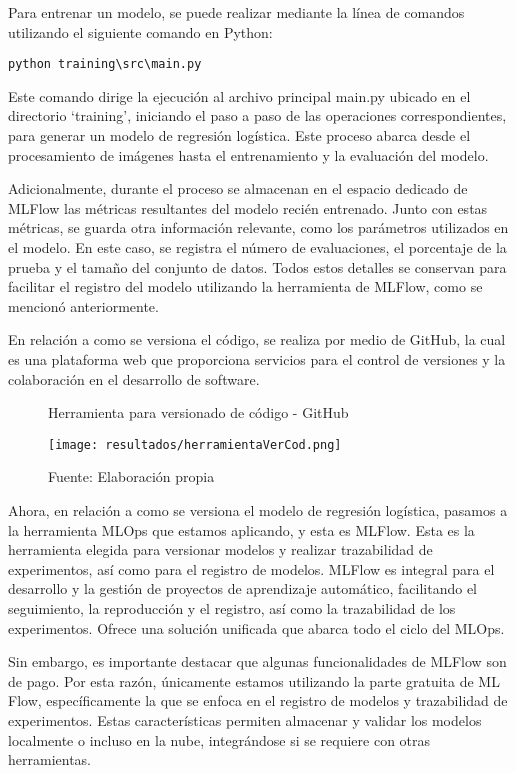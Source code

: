 Para entrenar un modelo, se puede realizar mediante la línea de comandos utilizando el siguiente comando en Python: 
\begin{verbatim}
python training\src\main.py
\end{verbatim}

Este comando dirige la ejecución al archivo principal main.py ubicado en el directorio `training', iniciando el paso a paso de las operaciones correspondientes, para generar un modelo de regresión logística. Este proceso abarca desde el procesamiento de imágenes hasta el entrenamiento y la evaluación del modelo. \newline

Adicionalmente, durante el proceso se almacenan en el espacio dedicado de MLFlow las métricas resultantes del modelo recién entrenado. Junto con estas métricas, se guarda otra información relevante, como los parámetros utilizados en el modelo. En este caso, se registra el número de evaluaciones, el porcentaje de la prueba y el tamaño del conjunto de datos. Todos estos detalles se conservan para facilitar el registro del modelo utilizando la herramienta de MLFlow, como se mencionó anteriormente. \newline

En relación a como se versiona el código, se realiza por medio de GitHub, la cual es una plataforma web que proporciona servicios para el control de versiones y la colaboración en el desarrollo de software.

\newpage

\begin{figure}[h]
\centering
\caption{Herramienta para versionado de código - GitHub}
\texttt{[image: resultados/herramientaVerCod.png]}
\caption*{\footnotesize Fuente: Elaboración propia}
\label{fig:figuraHerramientaVerCod}
\end{figure}

Ahora, en relación a como se versiona el modelo de regresión logística, pasamos a la herramienta MLOps que estamos aplicando, y esta es MLFlow. Esta es la herramienta elegida para versionar modelos y realizar trazabilidad de experimentos, así como para el registro de modelos. MLFlow es integral para el desarrollo y la gestión de proyectos de aprendizaje automático, facilitando el seguimiento, la reproducción y el registro, así como la trazabilidad de los experimentos. Ofrece una solución unificada que abarca todo el ciclo del MLOps. \newline

Sin embargo, es importante destacar que algunas funcionalidades de MLFlow son de pago. Por esta razón, únicamente estamos utilizando la parte gratuita de ML Flow, específicamente la que se enfoca en el registro de modelos y trazabilidad de experimentos. Estas características permiten almacenar y validar los modelos localmente o incluso en la nube, integrándose si se requiere con otras herramientas.

